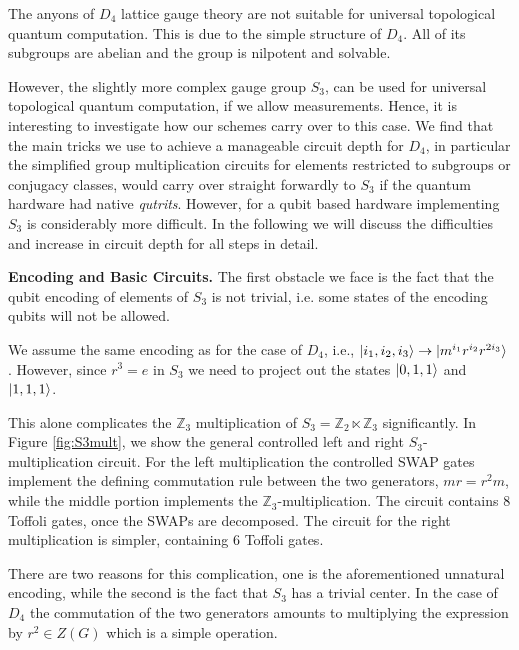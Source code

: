 \documentclass[two column]{article}
\begin{document}
The anyons of $D_4$ lattice gauge theory are not suitable for universal topological quantum computation.
This is due to the simple structure of $D_4$. All of its subgroups are abelian and the group is nilpotent and solvable. 



However, the slightly more complex gauge group $S_3$, can be used for universal topological quantum computation, if we allow measurements. Hence, it is interesting to investigate how our schemes carry over to this case. We find that the main tricks we use to achieve a manageable circuit depth for $D_4$, in particular the simplified group multiplication circuits for elements restricted to subgroups or conjugacy classes, would carry over straight forwardly to $S_3$ if the quantum hardware had native \emph{qutrits}. However, for a qubit based hardware implementing $S_3$ is considerably more difficult. In the following we will discuss the difficulties and increase in circuit depth for all steps in detail. 

\textbf{Encoding and Basic Circuits.} The first obstacle we face is the fact that the qubit encoding of elements of $S_3$ is not trivial, i.e. some states of the encoding qubits will not be allowed.

We assume the same encoding as for the case of $D_4$, i.e., $\ket{i_1,i_2,i_3} \to \ket{m^{i_1}r^{i_2}r^{2 i_3}}$. However, since $r^3 = e$ in $S_3$ we need to project out the states $\ket{0,1,1}$ and $\ket{1,1,1}$.

This alone complicates the $\mathbb{Z}_3$ multiplication of $S_3 = \mathbb{Z}_2 \ltimes \mathbb{Z}_3$ significantly. In Figure \ref{fig:S3mult}, we show the general controlled left and right $S_3$-multiplication circuit. For the left multiplication the controlled SWAP gates implement the defining commutation rule between the two generators, $mr = r^2m$, while the middle portion implements the $\mathbb{Z}_3$-multiplication. The circuit contains 8 Toffoli gates, once the SWAPs are decomposed. The circuit for the right multiplication is simpler, containing 6 Toffoli gates.

There are two reasons for this complication, one is the aforementioned unnatural encoding, while the second is the fact that $S_3$ has a trivial center. In the case of $D_4$ the commutation of the two generators amounts to multiplying the expression by $r^2 \in Z(G)$ which is a simple operation.
\end{document}
